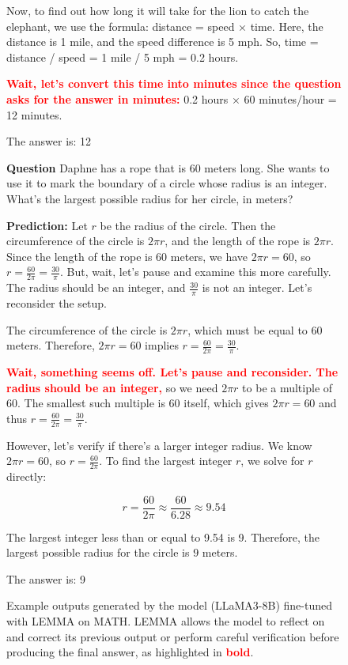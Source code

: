 \begin{figure}
\begin{tcolorbox}[boxrule=0.5mm, left=1mm, right=1mm, top=1mm, bottom=1mm,title=\textbf{Example 2}]
        Now, to find out how long it will take for the lion to catch the elephant, we use the formula: distance = speed × time.
        Here, the distance is 1 mile, and the speed difference is 5 mph.
        So, time = distance / speed = 1 mile / 5 mph = 0.2 hours.
        
        \textcolor{red}{\textbf{Wait, let's convert this time into minutes since the question asks for the answer in minutes:}}
        0.2 hours × 60 minutes/hour = 12 minutes.
        
        The answer is: 12

    \end{tcolorbox}

    \begin{tcolorbox}[boxrule=0.5mm, left=1mm, right=1mm, top=1mm, bottom=1mm,title=\textbf{Example 3}]
        \textbf{Question}
        Daphne has a rope that is 60 meters long. She wants to use it to mark the boundary of a circle whose radius is an integer. What's the largest possible radius for her circle, in meters?

        \textbf{Prediction:} 
        Let $r$ be the radius of the circle.  Then the circumference of the circle is $2\pi r$, and the length of the rope is $2\pi r$.  Since the length of the rope is 60 meters, we have $2\pi r = 60$, so $r = \frac{60}{2\pi} = \frac{30}{\pi}$.  
        But, wait, let's pause and examine this more carefully. The radius should be an integer, and $\frac{30}{\pi}$ is not an integer. Let's reconsider the setup.
        
        The circumference of the circle is $2\pi r$, which must be equal to 60 meters. Therefore, $2\pi r = 60$ implies $r = \frac{60}{2\pi} = \frac{30}{\pi}$. 
        
        \textcolor{red}{\textbf{Wait, something seems off. Let's pause and reconsider. The radius should be an integer,}} so we need $2\pi r$ to be a multiple of 60. The smallest such multiple is 60 itself, which gives $2\pi r = 60$ and thus $r = \frac{60}{2\pi} = \frac{30}{\pi}$.
        
        However, let's verify if there's a larger integer radius. We know $2\pi r = 60$, so $r = \frac{60}{2\pi}$. To find the largest integer $r$, we solve for $r$ directly:
        
        \[ r = \frac{60}{2\pi} \approx \frac{60}{6.28} \approx 9.54 \]
        
        The largest integer less than or equal to 9.54 is 9. Therefore, the largest possible radius for the circle is $\boxed{9}$ meters.
        
        The answer is: 9

    \end{tcolorbox}
    \caption{Example outputs generated by the model (LLaMA3-8B) fine-tuned with LEMMA on MATH. LEMMA allows the model to reflect on and correct its previous output or perform careful verification before producing the final answer, as highlighted in \textcolor{red}{\textbf{bold}}.}
    \label{fig:case_study_math}
\end{figure}
